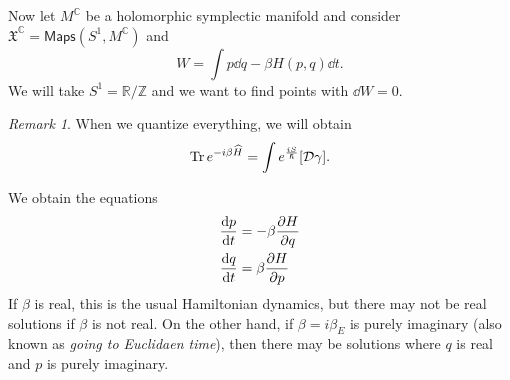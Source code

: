 \documentclass[leqno, openany]{memoir}
\theoremstyle{definition}
\theoremstyle{remark}
\newtheorem{rmk}[thm]{Remark}
\theoremstyle{plain}
\theoremstyle{definition}
\theoremstyle{remark}
\newcommand{\R}{\mathbb{R}}
\newcommand{\C}{\mathbb{C}}
\newcommand{\Z}{\mathbb{Z}}
\newcommand{\mc}[1]{\mathcal{#1}}
\newcommand{\mf}[1]{\mathfrak{#1}}
\newcommand{\ms}[1]{\mathsf{#1}}
\newcommand{\wh}[1]{\widehat{#1}}
\begin{document}
Now let $M^{\C}$ be a holomorphic symplectic manifold and consider $\mf{X}^{\C} = \ms{Maps}(S^1, M^{\C})$ and
\[ W = \int p \dd{q} - \beta H(p,q) \dd{t}. \]
We will take $S^1 = \R/\Z$ and we want to find points with $\dd{W} = 0$.

\begin{rmk}
When we quantize everything, we will obtain
\[ \Tr e^{-i\beta \wh{H}} = \int e^{\frac{iS}{\hslash}} [\mc{D}\gamma]. \]
\end{rmk}

We obtain the equations
\begin{align*}
\dv{p}{t} &= - \beta \pdv{H}{q} \\
\dv{q}{t} &=  \beta \pdv{H}{p} 
\end{align*}
If $\beta$ is real, this is the usual Hamiltonian dynamics, but there may not be real solutions if $\beta$ is not real. On the other hand, if $\beta = i\beta_E$ is purely imaginary (also known as \textit{going to Euclidaen time}), then there may be solutions where $q$ is real and $p$ is purely imaginary.
\end{document}
